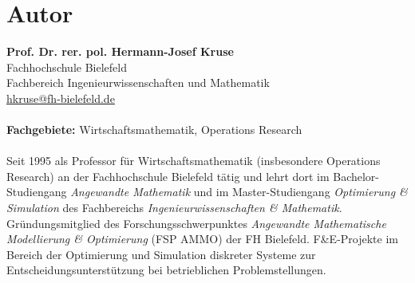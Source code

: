 \documentclass[fontsize=12pt,doubleside,openany,listof=totoc,listof=flat,listof=nochaptergap,numbers=noenddot]{scrbook}
\theoremstyle{style}
\begin{document}
\appendix














\newpage
\thispagestyle{empty} 
\section*{Autor}

\noindent\textbf{Prof. Dr. rer. pol. Hermann-Josef Kruse}\\
Fachhochschule Bielefeld\\
Fachbereich Ingenieurwissenschaften und Mathematik\\
\href{mailto:hkruse@fh-bielefeld.de}{hkruse@fh-bielefeld.de}
\\ \\
\textbf{Fachgebiete:} Wirtschaftsmathematik, Operations Research
\\ \\
Seit 1995 als Professor für Wirtschaftsmathematik (insbesondere Operations Research) an der Fachhochschule Bielefeld tätig und lehrt dort im Bachelor-Studiengang \textit{Angewandte Mathematik} und im Master-Studiengang \textit{Optimierung \& Simulation} des Fachbereichs \textit{Ingenieurwissenschaften \& Mathematik}. Gründungsmitglied des Forschungsschwerpunktes \textit{Angewandte Mathematische Modellierung \& Optimierung} (FSP AMMO) der FH Bielefeld. F\&E-Projekte im Bereich der Optimierung und Simulation diskreter Systeme zur Entscheidungsunterstützung bei betrieblichen Problemstellungen.
\end{document}
